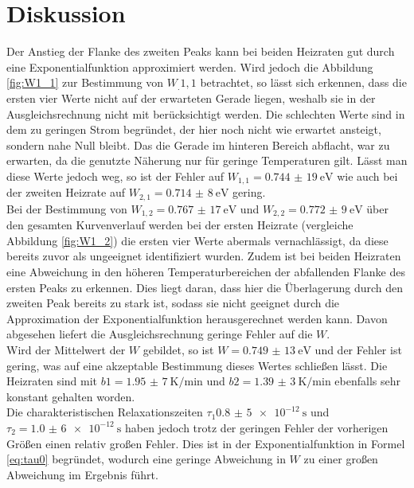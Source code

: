 
\section{Diskussion}
\label{sec:Diskussion}

Der Anstieg der Flanke des zweiten Peaks kann bei beiden Heizraten gut durch eine Exponentialfunktion approximiert werden. Wird jedoch die Abbildung \ref{fig:W1_1} zur Bestimmung von $W_.{1,1}$ betrachtet, so lässt sich erkennen, dass die ersten vier Werte nicht auf der erwarteten Gerade liegen, weshalb sie in der Ausgleichsrechnung nicht mit berücksichtigt werden. Die schlechten Werte sind in dem zu geringen Strom begründet, der hier noch nicht wie erwartet ansteigt, sondern nahe Null bleibt. Das die Gerade im hinteren Bereich abflacht, war zu erwarten, da die genutzte Näherung nur für geringe Temperaturen gilt. Lässt man diese Werte jedoch weg, so ist der Fehler auf $W_{1,1}=\SI{0,744(19)}{\electronvolt}$ wie auch bei der zweiten Heizrate auf $W_{2,1}=\SI{0,714(8)}{\electronvolt}$ gering.\\
Bei der Bestimmung von $W_{1,2}=\SI{0,767(17)}{\electronvolt}$ und $W_{2,2}=\SI{0,772(9)}{\electronvolt}$ über den gesamten Kurvenverlauf werden bei der ersten Heizrate (vergleiche Abbildung \ref{fig:W1_2}) die ersten vier Werte abermals vernachlässigt, da diese bereits zuvor als ungeeignet identifiziert wurden. Zudem ist bei beiden Heizraten eine Abweichung in den höheren Temperaturbereichen der abfallenden Flanke des ersten Peaks zu erkennen. Dies liegt daran, dass hier die Überlagerung durch den zweiten Peak bereits zu stark ist, sodass sie nicht geeignet durch die Approximation der Exponentialfunktion herausgerechnet werden kann. Davon abgesehen liefert die Ausgleichsrechnung geringe Fehler auf die $W$.\\
Wird der Mittelwert der $W$ gebildet, so ist $W=\SI{0,749(13)}{\electronvolt}$ und der Fehler ist gering, was auf eine akzeptable Bestimmung dieses Wertes schließen lässt. Die Heizraten sind mit $b1=\SI{1,95(7)}{\kelvin\per\minute}$ und $b2=\SI{1,39(3)}{\kelvin\per\minute}$ ebenfalls sehr konstant gehalten worden.\\
Die charakteristischen Relaxationszeiten $\tau_1\SI{0,8(5)e-12}{\second}$ und $\tau_2=\SI{1,0(6)e-12}{\second}$ haben jedoch trotz der geringen Fehler der vorherigen Größen einen relativ großen Fehler. Dies ist in der Exponentialfunktion in Formel \eqref{eq:tau0} begründet, wodurch eine geringe Abweichung in $W$ zu einer großen Abweichung im Ergebnis führt.

